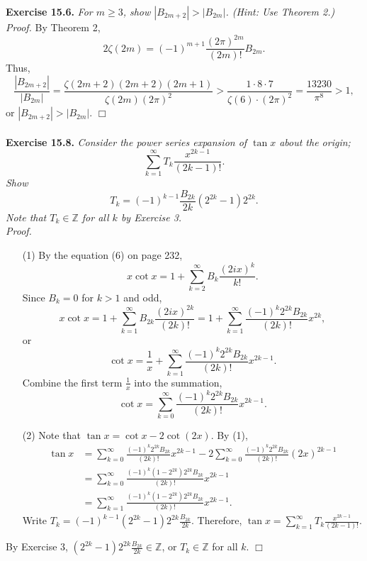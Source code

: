 \documentclass{article}
\begin{document}
\textbf{Exercise 15.6.}
\emph{For $m \geq 3$, show $|B_{2m+2}| > |B_{2m}|$. (Hint: Use Theorem 2.)} \\

\emph{Proof.}
By Theorem 2,
$$2 \zeta(2m) = (-1)^{m+1} \frac{(2\pi)^{2m}}{(2m)!} B_{2m}.$$
Thus,
$$\frac{|B_{2m+2}|}{|B_{2m}|}
= \frac{\zeta(2m+2)(2m+2)(2m+1)}{\zeta(2m)(2\pi)^2}
> \frac{1 \cdot 8 \cdot 7}{\zeta(6) \cdot (2\pi)^2}
= \frac{13230}{\pi^8}
> 1,$$
or $|B_{2m+2}| > |B_{2m}|$.
$\Box$ \\\\



\textbf{Exercise 15.8.}
\emph{Consider the power series expansion of $\tan x$ about the origin;
$$\sum_{k=1}^{\infty} T_k \frac{x^{2k - 1}}{(2k - 1)!}.$$
Show $$T_k = (-1)^{k-1} \frac{B_{2k}}{2k} (2^{2k} - 1) 2^{2k}.$$
Note that $T_k \in \mathbb{Z}$ for all $k$ by Exercise 3.} \\

\emph{Proof.}
\begin{enumerate}
\item[(1)]
By the equation (6) on page 232,
$$x \cot x = 1 + \sum_{k=2}^{\infty} B_k \frac{(2ix)^k}{k!}.$$
Since $B_k = 0$ for $k > 1$ and odd,
$$x \cot x
= 1 + \sum_{k=1}^{\infty} B_{2k} \frac{(2ix)^{2k}}{(2k)!}
= 1 + \sum_{k=1}^{\infty} \frac{(-1)^k 2^{2k}B_{2k}}{(2k)!} x^{2k},$$
or
$$\cot x
= \frac{1}{x} + \sum_{k=1}^{\infty} \frac{(-1)^k 2^{2k}B_{2k}}{(2k)!} x^{2k-1}.$$
Combine the first term $\frac{1}{x}$ into the summation,
$$\cot x = \sum_{k=0}^{\infty} \frac{(-1)^k 2^{2k}B_{2k}}{(2k)!} x^{2k-1}.$$
\item[(2)]
Note that $\tan x = \cot x - 2 \cot(2x)$.
By (1),
\begin{align*}
\tan x
&= \sum_{k=0}^{\infty} \frac{(-1)^k 2^{2k}B_{2k}}{(2k)!} x^{2k-1}
- 2 \sum_{k=0}^{\infty} \frac{(-1)^k 2^{2k}B_{2k}}{(2k)!} (2x)^{2k-1} \\
&= \sum_{k=0}^{\infty} \frac{(-1)^k (1 - 2^{2k}) 2^{2k} B_{2k}}{(2k)!} x^{2k-1} \\
&= \sum_{k=1}^{\infty} \frac{(-1)^k (1 - 2^{2k}) 2^{2k} B_{2k}}{(2k)!} x^{2k-1}.
\end{align*}
Write $T_k = (-1)^{k-1} (2^{2k} - 1) 2^{2k} \frac{B_{2k}}{2k}$.
Therefore, $\tan x = \sum_{k=1}^{\infty} T_k \frac{x^{2k - 1}}{(2k - 1)!}$.
\end{enumerate}
By Exercise 3, $(2^{2k} - 1) 2^{2k} \frac{B_{2k}}{2k} \in \mathbb{Z}$,
or $T_k \in \mathbb{Z}$ for all $k$.
$\Box$ \\\\
\end{document}
